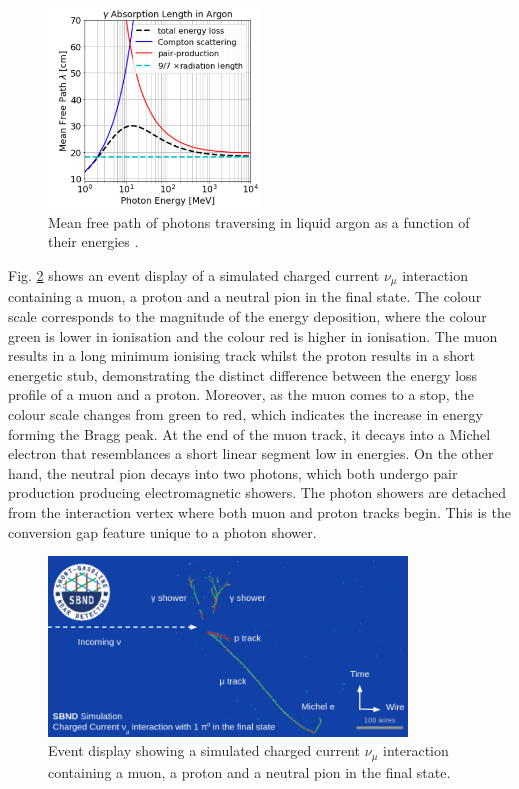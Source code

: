 \begin{figure}[ht!] 
\centering    
\includegraphics[width=0.5\textwidth]{uboone_gamma}
\caption[Mean Free Path of Photons in Liquid Argon]{
Mean free path of photons traversing in liquid argon as a function of their energies \cite{uboone_gamma}.
}
\label{fig:uboone_gamma}
\end{figure}

Fig. \ref{fig:track_shower} shows an event display of a simulated charged current $\nu_{\mu}$ interaction containing a muon, a proton and a neutral pion in the final state.
The colour scale corresponds to the magnitude of the energy deposition, where the colour green is lower in ionisation and the colour red is higher in ionisation.
The muon results in a long minimum ionising track whilst the proton results in a short energetic stub, demonstrating the distinct difference between the energy loss profile of a muon and a proton.
Moreover, as the muon comes to a stop, the colour scale changes from green to red, which indicates the increase in energy forming the Bragg peak.
At the end of the muon track, it decays into a Michel electron that resemblances a short linear segment low in energies. 
On the other hand, the neutral pion decays into two photons, which both undergo pair production producing electromagnetic showers.
The photon showers are detached from the interaction vertex where both muon and proton tracks begin.
This is the conversion gap feature unique to a photon shower.

\begin{figure}[ht!] 
\centering    
\includegraphics[width=0.85\textwidth]{event_display}
\caption[Event Display of a Neutrino Interaction]{
Event display showing a simulated charged current $\nu_{\mu}$ interaction containing a muon, a proton and a neutral pion in the final state.
}
\label{fig:track_shower}
\end{figure}

